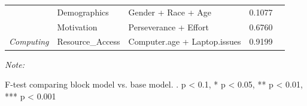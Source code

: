 \begin{table}[!h]
\begin{threeparttable}
\begin{tabular}[t]{>{}lllrl}
 & Demographics & Gender + Race + Age & 0.1077 & \\

 & Motivation & Perseverance + Effort & 0.6760 & \\

\multirow[t]{-5}{*}[\normalbaselineskip]{\raggedright\arraybackslash \em{Computing}} & Resource_Access & Computer.age + Laptop.issues & 0.9199 & \\
\bottomrule
\end{tabular}
\begin{tablenotes}[para]
\item \textit{Note: } 
\item F-test comparing block model vs. base model. . p < 0.1, * p < 0.05, ** p < 0.01, *** p < 0.001
\end{tablenotes}
\end{threeparttable}
\end{table}
